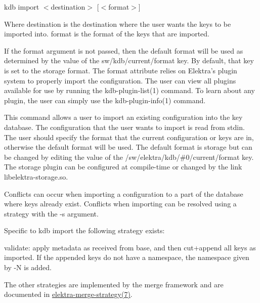 {\ttfamily kdb import $<$destination$>$ \mbox{[}$<$format$>$\mbox{]}}

Where {\ttfamily destination} is the destination where the user wants the keys to be imported into. {\ttfamily format} is the format of the keys that are imported.

If the {\ttfamily format} argument is not passed, then the default format will be used as determined by the value of the {\ttfamily sw/kdb/current/format} key. By default, that key is set to the {\ttfamily storage} format. The {\ttfamily format} attribute relies on Elektra’s plugin system to properly import the configuration. The user can view all plugins available for use by running the kdb-\/plugin-\/list(1) command. To learn about any plugin, the user can simply use the kdb-\/plugin-\/info(1) command.

This command allows a user to import an existing configuration into the key database. The configuration that the user wants to import is read from {\ttfamily stdin}. The user should specify the format that the current configuration or keys are in, otherwise the default format will be used. The default format is {\ttfamily storage} but can be changed by editing the value of the {\ttfamily /sw/elektra/kdb/\#0/current/format} key. The {\ttfamily storage} plugin can be configured at compile-\/time or changed by the link {\ttfamily libelektra-\/storage.\+so}.

Conflicts can occur when importing a configuration to a part of the database where keys already exist. Conflicts when importing can be resolved using a strategy with the {\ttfamily -\/s} argument.

Specific to {\ttfamily kdb import} the following strategy exists\+:


\begin{DoxyItemize}
\item {\ttfamily validate}\+: apply metadata as received from base, and then cut+append all keys as imported. If the appended keys do not have a namespace, the namespace given by {\ttfamily -\/N} is added.
\end{DoxyItemize}

The other strategies are implemented by the merge framework and are documented in \hyperlink{doc_help_elektra-merge-strategy_md}{elektra-\/merge-\/strategy(7)}.



